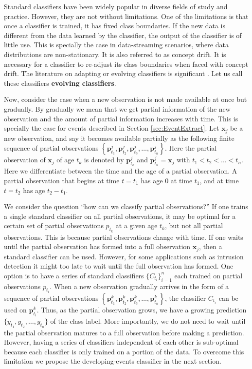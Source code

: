 \documentclass[a4paper,11pt]{article}
\begin{document}
Standard classifiers have been widely popular in diverse fields of study and practice. However, they are not without limitations. One of the limitations is that once a classifier is trained, it has fixed class boundaries. If the new data is different from the data learned by the classifier, the output of the classifier is of little use. This is specially the case in data-streaming scenarios, where data distributions are non-stationary. It is also referred to as concept drift. It is necessary for a classifier to re-adjust its class boundaries when faced with concept drift. The literature on adapting or evolving classifiers is significant \cite{duchi2011adaptive, dabbagh2005online, frey1991letter, giacinto1997adaptive, nishida2005ace,alippi2008just, alippi2008just2}. Let us call these classifiers {\bf{evolving classifiers}}.

Now, consider the case when a new observation is not made available at once but gradually. By gradually we mean that we get partial information of the new observation and the amount of partial information increases with time. This is specially the case for events described in Section \ref{sec:EventExtract}. Let $\bm{x}_j$ be a new observation, and say it becomes available partially as the following finite sequence of partial observations $\left \{\bm{p}^j_{t_1},\bm{p}^j_{t_2}, \bm{p}^j_{t_3}, \dots, \bm{p}^j_{t_n} \right \}$. Here the partial observation of $\bm{x}_j$ of age $t_k$ is denoted by $\bm{p}^j_{t_k}$ and $\bm{p}^j_{t_n} = \bm{x}_j$ with $t_1 < t_2 < \dots < t_n$. Here we differentiate between the time and the age of a partial observation. A partial observation that begins at time $t =t_1$ has age $0$ at time $t_1$, and at time $t = t_2$ has age $ t_2 - t_1$.

We consider the question ``how can we classify partial observations?'' If one trains a single standard classifier on all partial observations, it may be optimal for a certain set of partial observations $p_{t_k}$ at a given age $t_k$, but not all partial observations. This is because partial observations change with time. If one waits until the partial observation has formed into a full observation $\bm{x}_j$, then a standard classifier can be used. However, for some applications such as intrusion detection it might too late to wait until the full observation has formed. One option is to have a series of standard classifiers $\{C_{t_i}\}_{i=1}^n $ each trained on partial observations $p_{t_i}$. 	 When a new observation gradually arrives in the form of a sequence of partial observations $\left \{\bm{p}^k_{t_1},\bm{p}^k_{t_2}, \bm{p}^k_{t_3}, \dots, \bm{p}^k_{t_n} \right \}$, the classifier $C_{t_i}$ can be used on $\bm{p}^k_{t_i}$. Thus, as the partial observation grows, we have a growing prediction $\{y_{t_1}, y_{t_2}, \dots, y_{t_n}\}$ of the class label. More importantly, we do not need to wait until the partial observation matures to a full observation before making a prediction. However, having a series of classifiers independent of each other is sub-optimal because each classifier is only trained on a portion of the data. To overcome this limitation we propose the developing-events classifier in the next section.
\end{document}
